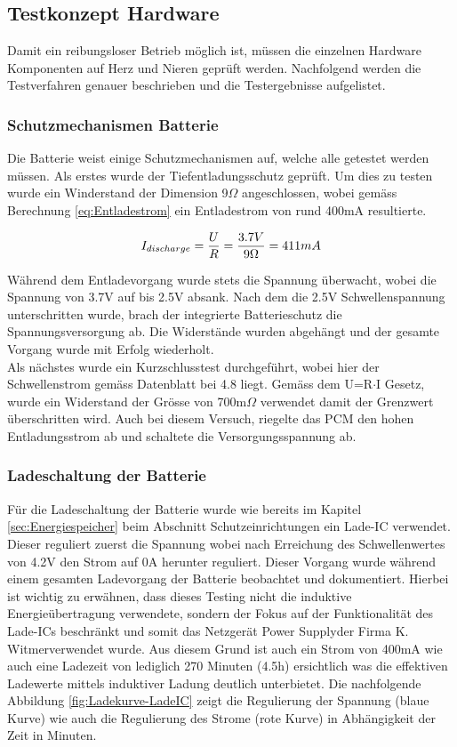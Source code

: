 \subsection{Testkonzept Hardware}\label{sec:testkonzeptHardware}
Damit ein reibungsloser Betrieb möglich ist, müssen die einzelnen Hardware Komponenten auf Herz und Nieren geprüft werden. Nachfolgend werden die Testverfahren genauer beschrieben und die Testergebnisse aufgelistet.

\subsubsection*{Schutzmechanismen Batterie}\label{sec:batterie}
Die Batterie weist einige Schutzmechanismen auf, welche alle getestet werden müssen. Als erstes wurde der Tiefentladungsschutz geprüft. Um dies zu testen wurde ein Winderstand der Dimension 9$\Omega$ angeschlossen, wobei gemäss Berechnung \ref{eq:Entladestrom} ein Entladestrom von rund 400mA resultierte.

\begin{equation}
\centering
I_{discharge}=\frac{U}{R}=\frac{3.7V}{9\Omega }= 411mA
\label{eq:Entladestrom}
\end{equation}

Während dem Entladevorgang wurde stets die Spannung überwacht, wobei die Spannung von 3.7V auf bis 2.5V absank. Nach dem die 2.5V Schwellenspannung unterschritten wurde, brach der integrierte Batterieschutz die Spannungsversorgung ab. Die Widerstände wurden abgehängt und der gesamte Vorgang wurde mit Erfolg wiederholt.
\\
Als nächstes wurde ein Kurzschlusstest durchgeführt, wobei hier der Schwellenstrom gemäss Datenblatt bei 4.8 liegt. Gemäss dem U=R$\cdot$I Gesetz, wurde ein Widerstand der Grösse von 700m$\Omega$ verwendet damit der Grenzwert überschritten wird. Auch bei diesem Versuch, riegelte das PCM den hohen Entladungsstrom ab und schaltete die Versorgungsspannung ab.

\subsubsection*{Ladeschaltung der Batterie}\label{sec:batterie}
Für die Ladeschaltung der Batterie wurde wie bereits im Kapitel \ref{sec:Energiespeicher} beim Abschnitt Schutzeinrichtungen ein Lade-IC verwendet. Dieser reguliert zuerst die Spannung wobei nach Erreichung des Schwellenwertes von 4.2V den Strom auf 0A herunter reguliert. Dieser Vorgang wurde während einem gesamten Ladevorgang der Batterie beobachtet und dokumentiert. Hierbei ist wichtig zu erwähnen, dass dieses Testing nicht die induktive Energieübertragung verwendete, sondern der Fokus auf der Funktionalität des Lade-ICs beschränkt und somit das Netzgerät \glqq Power Supply\grqq\space der Firma \glqq K. Witmer\grqq\space verwendet wurde. Aus diesem Grund ist auch ein Strom von 400mA wie auch eine Ladezeit von lediglich 270 Minuten (4.5h) ersichtlich was die effektiven Ladewerte mittels induktiver Ladung deutlich unterbietet. Die nachfolgende Abbildung \ref{fig:Ladekurve-LadeIC} zeigt die Regulierung der Spannung (blaue Kurve) wie auch die Regulierung des Strome (rote Kurve) in Abhängigkeit der Zeit in Minuten.


